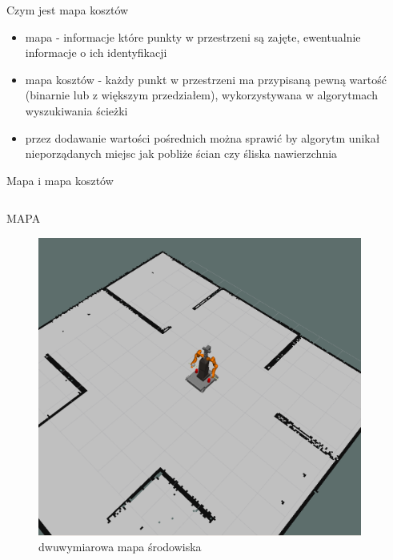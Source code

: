 
\begin{frame}{Czym jest mapa kosztów}
	\begin{itemize}
		\item mapa - informacje które punkty w przestrzeni są zajęte, ewentualnie informacje o ich identyfikacji
		\item mapa kosztów - każdy punkt w przestrzeni ma przypisaną pewną wartość (binarnie lub z większym przedziałem), wykorzystywana w algorytmach wyszukiwania ścieżki
		\item przez dodawanie wartości pośrednich można sprawić by algorytm unikał nieporządanych miejsc jak pobliże ścian czy śliska nawierzchnia
	\end{itemize}
\end{frame}

\begin{frame}{Mapa i mapa kosztów}
\begin{columns}
		\begin{column}{0.5\textwidth}
			\begin{center}
				MAPA
				\begin{figure}
					\centering
					\includegraphics[height=0.55\textheight]{img/mapa_2d.png}
					\caption{dwuwymiarowa mapa środowiska}
				\end{figure}
			\end{center}
		\end{column}
		\begin{column}{0.5\textwidth}  %

\end{column}
\end{columns}
\end{frame}
